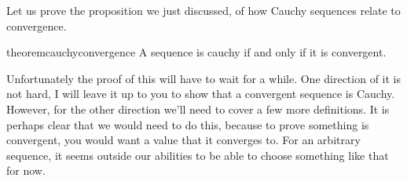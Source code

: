 Let us prove the proposition we just discussed, of how Cauchy sequences relate to convergence.

\begin{restatable}{theorem}{cauchyconvergence}
\label{thm:cauchy_convergence}
A sequence is cauchy if and only if it is convergent.
\end{restatable}

Unfortunately the proof of this will have to wait for a while. One direction of it is not
hard, I will leave it up to you to show that a convergent sequence is Cauchy. However,
for the other direction we'll need to cover a few more definitions. It is perhaps clear
that we would need to do this, because to prove something is convergent, you would want a value
that it converges to. For an arbitrary sequence, it seems outside our abilities
to be able to choose something like that for now.

